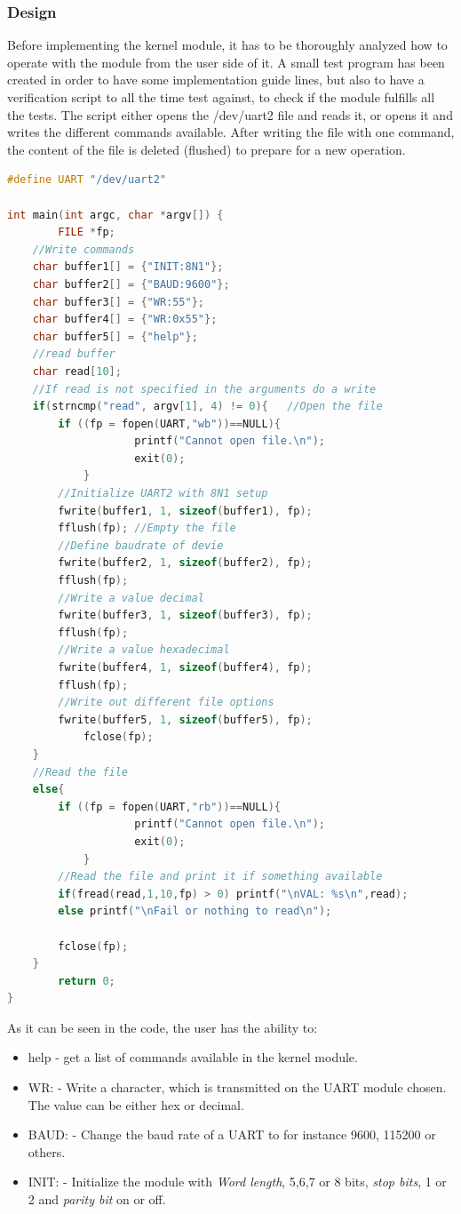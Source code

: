 \subsubsection{Design}
Before implementing the kernel module, it has to be thoroughly analyzed how to operate with the module from the user side of it. A small test program has been created in order to have some implementation guide lines, but also to have a verification script to all the time test against, to check if the module fulfills all the tests. 
\p The script either opens the /dev/uart2 file and reads it, or opens it and writes the different commands available. After writing the file with one command, the content of the file is deleted (flushed) to prepare for a new operation. 
\begin{lstlisting}[language=c]
#define UART "/dev/uart2"

int main(int argc, char *argv[]) {
        FILE *fp;
	//Write commands
	char buffer1[] = {"INIT:8N1"};
	char buffer2[] = {"BAUD:9600"};
	char buffer3[] = {"WR:55"};
	char buffer4[] = {"WR:0x55"};
	char buffer5[] = {"help"};
	//read buffer
	char read[10];
	//If read is not specified in the arguments do a write
	if(strncmp("read", argv[1], 4) != 0){	//Open the file
		if ((fp = fopen(UART,"wb"))==NULL){
                	printf("Cannot open file.\n");
               	 	exit(0);
        	}
		//Initialize UART2 with 8N1 setup
		fwrite(buffer1, 1, sizeof(buffer1), fp);
		fflush(fp); //Empty the file
		//Define baudrate of devie
		fwrite(buffer2, 1, sizeof(buffer2), fp);
		fflush(fp);
		//Write a value decimal
 		fwrite(buffer3, 1, sizeof(buffer3), fp);
		fflush(fp);
		//Write a value hexadecimal
 		fwrite(buffer4, 1, sizeof(buffer4), fp);
		fflush(fp);
		//Write out different file options
 		fwrite(buffer5, 1, sizeof(buffer5), fp);
        	fclose(fp);
	}
	//Read the file
	else{
		if ((fp = fopen(UART,"rb"))==NULL){
                	printf("Cannot open file.\n");
               	 	exit(0);
        	}
		//Read the file and print it if something available
		if(fread(read,1,10,fp) > 0) printf("\nVAL: %s\n",read);
		else printf("\nFail or nothing to read\n");

		fclose(fp);
	}
        return 0;
}
\end{lstlisting}
As it can be seen in the code, the user has the ability to:
\begin{itemize}
	\item help - get a list of commands available in the kernel module.
	\item WR: - Write a character, which is transmitted on the UART module chosen. The value can be either hex or decimal.
	\item BAUD: - Change the baud rate of a UART to for instance 9600, 115200 or others.
	\item INIT: - Initialize the module with \textit{Word length}, 5,6,7 or 8 bits, \textit{stop bits}, 1 or 2 and \textit{parity bit} on or off. 
\end{itemize}
